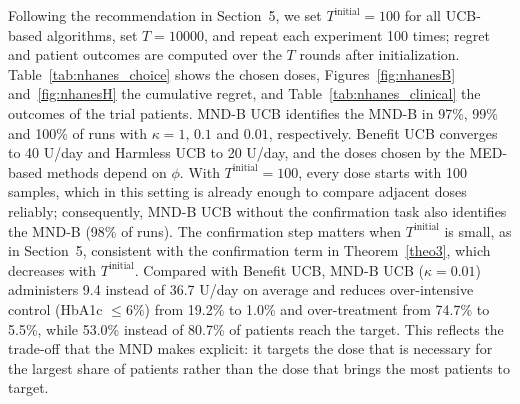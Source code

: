 Following the recommendation in Section~5, we set $T^{\text{initial}}=100$ for all UCB-based algorithms, set $T=10000$, and repeat each experiment 100 times; regret and patient outcomes are computed over the $T$ rounds after initialization. Table~\ref{tab:nhanes_choice} shows the chosen doses, Figures~\ref{fig:nhanesB} and~\ref{fig:nhanesH} the cumulative regret, and Table~\ref{tab:nhanes_clinical} the outcomes of the trial patients.
MND-B UCB identifies the MND-B in 97\%, 99\% and 100\% of runs with $\kappa=1$, $0.1$ and $0.01$, respectively. Benefit UCB converges to 40 U/day and Harmless UCB to 20 U/day, and the doses chosen by the MED-based methods depend on $\phi$. With $T^{\text{initial}}=100$, every dose starts with 100 samples, which in this setting is already enough to compare adjacent doses reliably; consequently, MND-B UCB without the confirmation task also identifies the MND-B (98\% of runs). The confirmation step matters when $T^{\text{initial}}$ is small, as in Section~5, consistent with the confirmation term in Theorem~\ref{theo3}, which decreases with $T^{\text{initial}}$. Compared with Benefit UCB, MND-B UCB ($\kappa=0.01$) administers 9.4 instead of 36.7 U/day on average and reduces over-intensive control (HbA1c $\le6\%$) from 19.2\% to 1.0\% and over-treatment from 74.7\% to 5.5\%, while 53.0\% instead of 80.7\% of patients reach the target. This reflects the trade-off that the MND makes explicit: it targets the dose that is necessary for the largest share of patients rather than the dose that brings the most patients to target.

